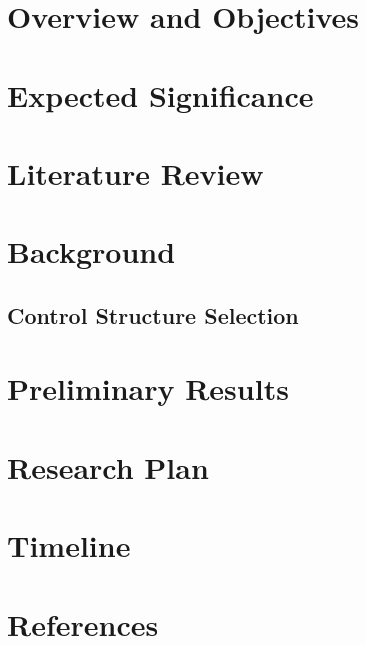 \documentclass[10.5pt]{article}
\begin{document}
\fancyfoot{}
\pagestyle{plain}



 
\pagebreak

\pagestyle{fancy}
\section{Overview and Objectives}\label{chapter: overview}
 

\pagestyle{fancy}
\section{Expected Significance}\label{chapter: significance}
 

\pagestyle{fancy}
\section{Literature Review}\label{chapter: review}
 

\pagestyle{fancy}
\section{Background}\label{chapter: content1}
 

\pagestyle{fancy}

\pagestyle{fancy}
\subsection{Control Structure Selection}\label{chapter: content2}
 

\pagestyle{fancy}
\section{Preliminary Results}\label{chapter: results}


\pagestyle{fancy}
\section{Research Plan}\label{chapter: plan}


\pagestyle{fancy}
\section{Timeline}\label{chapter: timeline}



\section*{References}
\printbibliography[heading=none]
\end{document}
